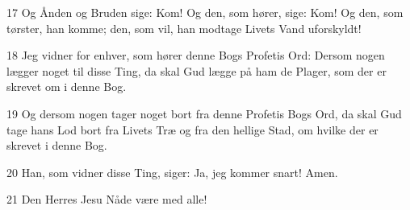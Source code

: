 \par 17 Og Ånden og Bruden sige: Kom! Og den, som hører, sige: Kom! Og den, som tørster, han komme; den, som vil, han modtage Livets Vand uforskyldt!
\par 18 Jeg vidner for enhver, som hører denne Bogs Profetis Ord: Dersom nogen lægger noget til disse Ting, da skal Gud lægge på ham de Plager, som der er skrevet om i denne Bog.
\par 19 Og dersom nogen tager noget bort fra denne Profetis Bogs Ord, da skal Gud tage hans Lod bort fra Livets Træ og fra den hellige Stad, om hvilke der er skrevet i denne Bog.
\par 20 Han, som vidner disse Ting, siger: Ja, jeg kommer snart! Amen.
\par 21 Den Herres Jesu Nåde være med alle!



